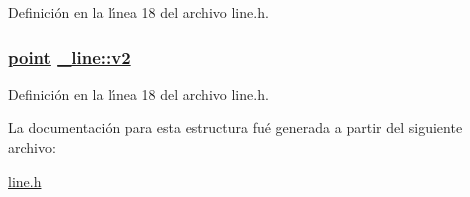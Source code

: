 Definici\'{o}n en la l\'{\i}nea 18 del archivo line.h.\hypertarget{struct__line_5701d84b34e7ca18c5a246d8f18239c2_5701d84b34e7ca18c5a246d8f18239c2}{
\subsubsection[v2]{\setlength{\rightskip}{0pt plus 5cm}\hyperlink{struct__point}{point} \hyperlink{struct__line_5701d84b34e7ca18c5a246d8f18239c2_5701d84b34e7ca18c5a246d8f18239c2}{\_\-line::v2}}}
\label{struct__line_5701d84b34e7ca18c5a246d8f18239c2_5701d84b34e7ca18c5a246d8f18239c2}




Definici\'{o}n en la l\'{\i}nea 18 del archivo line.h.

La documentaci\'{o}n para esta estructura fu\'{e} generada a partir del siguiente archivo:\begin{CompactItemize}
\item 
\hyperlink{line_8h}{line.h}\end{CompactItemize}
